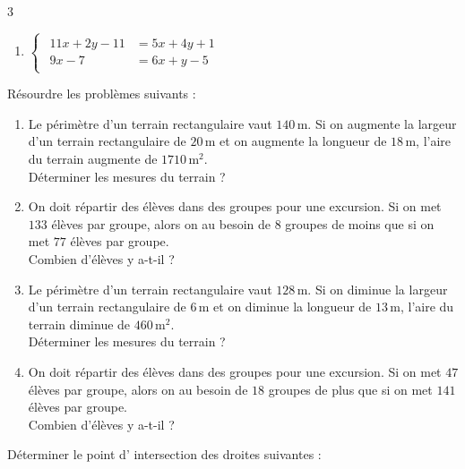 {\begin{Exercice}
\begin{multicols}{3}
\begin{enumerate}[itemsep=1em]
	\item \begin{minipage}[t]{\linewidth} $\begin{cases}\begin{aligned}11x+2y-11 &=5x+4y+1\\9x-7 &=6x+y-5\end{aligned}\end{cases}$\end{minipage}
\end{enumerate}
\end{multicols}
\end{Exercice}

\begin{Exercice}
Résourdre les problèmes suivants :

\begin{enumerate}[itemsep=1em]
\item Le périmètre d'un terrain rectangulaire vaut $140\,\text{m}$. Si on augmente la largeur d'un terrain rectangulaire de $20\,\text{m}$ et on 
         augmente la longueur de $18\,\text{m}$, l'aire du terrain augmente de $1710\,\text{m}^2$. \\ Déterminer les mesures du terrain ?
	\item On doit répartir des élèves dans des groupes pour une excursion. Si on met $133$ élèves par groupe, alors on au besoin de $8$ groupes de moins que si on met $77$ élèves par groupe. \\ Combien d'élèves y a-t-il ?
	\item Le périmètre d'un terrain rectangulaire vaut $128\,\text{m}$. Si on diminue la largeur d'un terrain rectangulaire de $6\,\text{m}$ et on 
         diminue la longueur de $13\,\text{m}$, l'aire du terrain diminue de $460\,\text{m}^2$. \\ Déterminer les mesures du terrain ?
	\item On doit répartir des élèves dans des groupes pour une excursion. Si on met $47$ élèves par groupe, alors on au besoin de $18$ groupes de plus que si on met $141$ élèves par groupe. \\ Combien d'élèves y a-t-il ?

\end{enumerate}
\end{Exercice}

\begin{Exercice}
Déterminer le point d' intersection des droites suivantes :


\end{Exercice}}
